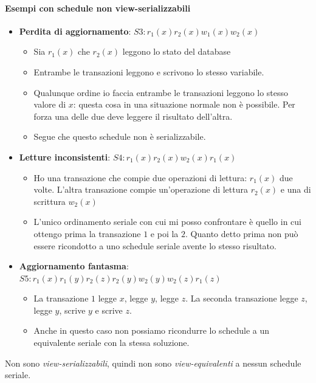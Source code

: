 \paragraph{Esempi con schedule non view-serializzabili} 
\begin{itemize}
	\item \textbf{Perdita di aggiornamento}: $S3: r_1(x) r_2(x) w_1(x) w_2(x)$
	\begin{itemize}
		\item Sia $r_1(x)$ che $r_2(x)$ leggono lo stato del database
		\item Entrambe le transazioni leggono e scrivono lo stesso variabile.
		\item Qualunque ordine io faccia entrambe le transazioni leggono lo stesso valore di $x$: questa cosa in una situazione normale non è possibile. Per forza una delle due deve leggere il risultato dell'altra.
		\item Segue che questo schedule non è serializzabile.
	\end{itemize}
	\item \textbf{Letture inconsistenti}: $S4: r_1(x) r_2(x) w_2(x) r_1(x)$
	\begin{itemize}
		\item Ho una transazione che compie due operazioni di lettura: $r_1(x)$ due volte. L'altra transazione compie un'operazione di lettura $r_2(x)$ e una di scrittura $w_2(x)$
		\item L'unico ordinamento seriale con cui mi posso confrontare è quello in cui ottengo prima la transazione $1$ e poi la $2$. Quanto detto prima non può essere ricondotto a uno schedule seriale avente lo stesso risultato.
	\end{itemize}
	\item \textbf{Aggiornamento fantasma}: $S5: r_1(x) r_1(y) r_2(z) r_2(y) w_2(y) w_2(z) r_1(z)$
	\begin{itemize}
		\item La transazione $1$ legge $x$, legge $y$, legge $z$. La seconda transazione legge $z$, legge $y$, scrive $y$ e scrive $z$.
		\item Anche in questo caso non possiamo ricondurre lo schedule a un equivalente seriale con la stessa soluzione.
	\end{itemize}
\end{itemize}
Non sono \emph{view-serializzabili}, quindi non sono \emph{view-equivalenti} a nessun schedule seriale.
